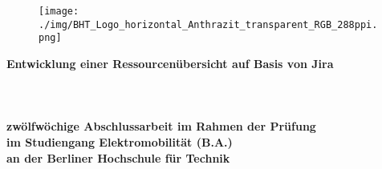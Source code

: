 \thispagestyle{empty}
\begin{titlepage}
	 \thispagestyle{empty}
\begin{center}
	 \thispagestyle{empty}
\begin{figure}[t]
	\centering
	\texttt{[image: ./img/BHT\_Logo\_horizontal\_Anthrazit\_transparent\_RGB\_288ppi.png]}
	
\end{figure}

$~~$\\
\textbf{\huge Entwicklung einer Ressourcenübersicht auf Basis von Jira}\paragraph{}$~~$\\
\paragraph{}$~~$\\
\paragraph{}$~~$\\
\textbf{zwölfwöchige Abschlussarbeit im Rahmen der Prüfung}\\ \textbf{im Studiengang Elektromobilität (B.A.)}\\ \textbf{an der Berliner Hochschule für Technik}
\paragraph{}$~~$\\
\paragraph{}$~~$\\
\paragraph{}$~~$\\
\\
\\
\\
\\
\\
\paragraph{}$~~$\\
\\
\end{center}	
\end{titlepage}

